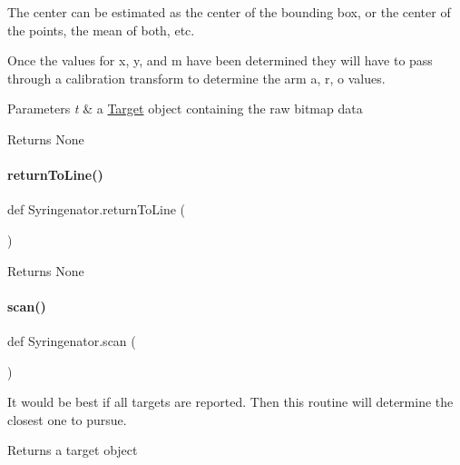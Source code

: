 The center can be estimated as the center of the bounding box, or the center of the points, the mean of both, etc.

Once the values for x, y, and m have been determined they will have to pass through a calibration transform to determine the arm a, r, o values.


\begin{DoxyParams}{Parameters}
{\em t} & a \mbox{\hyperlink{classSyringenator_1_1Target}{Target}} object containing the raw bitmap data \\
\hline
\end{DoxyParams}
\begin{DoxyReturn}{Returns}
None 
\end{DoxyReturn}
\mbox{\label{namespaceSyringenator_afe04905c8a4a9d077457422866633203}} 
\paragraph{\texorpdfstring{returnToLine()}{returnToLine()}}
{\footnotesize\ttfamily def Syringenator.\+return\+To\+Line (\begin{DoxyParamCaption}{ }\end{DoxyParamCaption})}

\begin{DoxyReturn}{Returns}
None 
\end{DoxyReturn}
\mbox{\label{namespaceSyringenator_aff01237d3ff3e33f0ffc32927d813df0}} 
\paragraph{\texorpdfstring{scan()}{scan()}}
{\footnotesize\ttfamily def Syringenator.\+scan (\begin{DoxyParamCaption}{ }\end{DoxyParamCaption})}

It would be best if all targets are reported. Then this routine will determine the closest one to pursue.

\begin{DoxyReturn}{Returns}
a target object 
\end{DoxyReturn}


